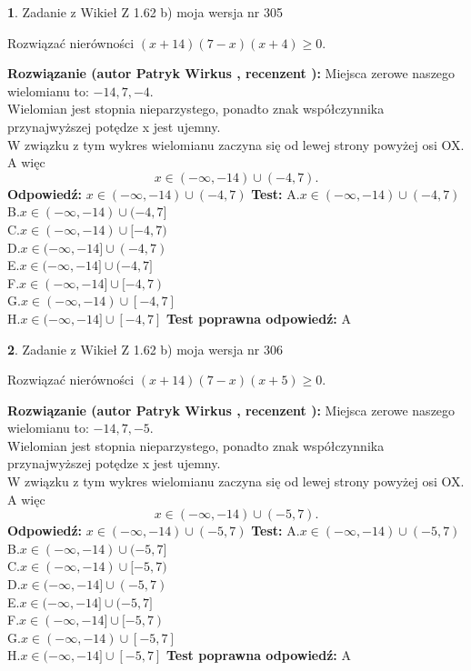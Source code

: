 \documentclass[12pt, a4paper]{article}
\theoremstyle{definition} %
\newtheorem{zad}{}
\newcommand{\zadStart}[1]{\begin{zad}#1\newline}
\newcommand{\zadStop}{\end{zad}}
\newcommand{\rozwStart}[2]{\noindent \textbf{Rozwiązanie (autor #1 , recenzent #2): }\newline}
\newcommand{\rozwStop}{\newline}
\newcommand{\odpStart}{\noindent \textbf{Odpowiedź:}\newline}
\newcommand{\odpStop}{\newline}
\newcommand{\testStart}{\noindent \textbf{Test:}\newline}
\newcommand{\testStop}{\newline}
\newcommand{\kluczStart}{\noindent \textbf{Test poprawna odpowiedź:}\newline}
\newcommand{\kluczStop}{\newline}
\begin{document}
\zadStart{Zadanie z Wikieł Z 1.62 b) moja wersja nr 305}

Rozwiązać nierówności $(x+14)(7-x)(x+4)\ge0$.
\zadStop
\rozwStart{Patryk Wirkus}{}
Miejsca zerowe naszego wielomianu to: $-14, 7, -4$.\\
Wielomian jest stopnia nieparzystego, ponadto znak współczynnika przy\linebreak najwyższej potędze x jest ujemny.\\ W związku z tym wykres wielomianu zaczyna się od lewej strony powyżej osi OX. A więc $$x \in (-\infty,-14) \cup (-4,7).$$
\rozwStop
\odpStart
$x \in (-\infty,-14) \cup (-4,7)$
\odpStop
\testStart
A.$x \in (-\infty,-14) \cup (-4,7)$\\
B.$x \in (-\infty,-14) \cup (-4,7]$\\
C.$x \in (-\infty,-14) \cup [-4,7)$\\
D.$x \in (-\infty,-14] \cup (-4,7)$\\
E.$x \in (-\infty,-14] \cup (-4,7]$\\
F.$x \in (-\infty,-14] \cup [-4,7)$\\
G.$x \in (-\infty,-14) \cup [-4,7]$\\
H.$x \in (-\infty,-14] \cup [-4,7]$
\testStop
\kluczStart
A
\kluczStop



\zadStart{Zadanie z Wikieł Z 1.62 b) moja wersja nr 306}

Rozwiązać nierówności $(x+14)(7-x)(x+5)\ge0$.
\zadStop
\rozwStart{Patryk Wirkus}{}
Miejsca zerowe naszego wielomianu to: $-14, 7, -5$.\\
Wielomian jest stopnia nieparzystego, ponadto znak współczynnika przy\linebreak najwyższej potędze x jest ujemny.\\ W związku z tym wykres wielomianu zaczyna się od lewej strony powyżej osi OX. A więc $$x \in (-\infty,-14) \cup (-5,7).$$
\rozwStop
\odpStart
$x \in (-\infty,-14) \cup (-5,7)$
\odpStop
\testStart
A.$x \in (-\infty,-14) \cup (-5,7)$\\
B.$x \in (-\infty,-14) \cup (-5,7]$\\
C.$x \in (-\infty,-14) \cup [-5,7)$\\
D.$x \in (-\infty,-14] \cup (-5,7)$\\
E.$x \in (-\infty,-14] \cup (-5,7]$\\
F.$x \in (-\infty,-14] \cup [-5,7)$\\
G.$x \in (-\infty,-14) \cup [-5,7]$\\
H.$x \in (-\infty,-14] \cup [-5,7]$
\testStop
\kluczStart
A
\kluczStop
\end{document}
